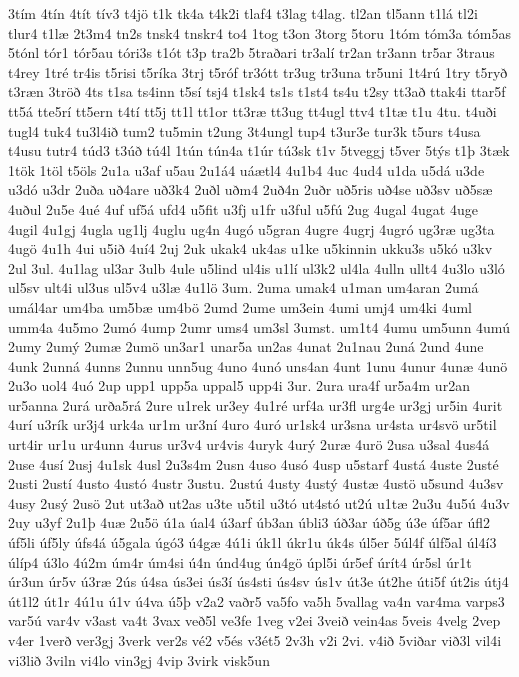 {3tím
4tín
4tít
tív3
t4jö
t1k
tk4a
t4k2i
tlaf4
t3lag
t4lag.
tl2an
tl5ann
t1lá
tl2i
tlur4
t1læ
2t3m4
tn2s
tnsk4
tnskr4
to4
1tog
t3on
3torg
5toru
1tóm
tóm3a
tóm5as
5tónl
tór1
tór5au
tóri3s
t1ót
t3p
tra2b
5traðari
tr3alí
tr2an
tr3ann
tr5ar
3traus
t4rey
1tré
tr4is
t5risi
t5ríka
3trj
t5róf
tr3ótt
tr3ug
tr3una
tr5uni
1t4rú
1try
t5ryð
t3ræn
3tröð
4ts
t1sa
ts4inn
t5sí
tsj4
t1sk4
ts1s
t1st4
ts4u
t2sy
tt3að
ttak4i
ttar5f
tt5á
tte5rí
tt5ern
t4tí
tt5j
tt1l
tt1or
tt3ræ
tt3ug
tt4ugl
ttv4
t1tæ
t1u
4tu.
t4uði
tugl4
tuk4
tu3l4ið
tum2
tu5min
t2ung
3t4ungl
tup4
t3ur3e
tur3k
t5urs
t4usa
t4usu
tutr4
túd3
t3úð
tú4l
1tún
tún4a
t1úr
tú3sk
t1v
5tveggj
t5ver
5týs
t1þ
3tæk
1tök
1töl
t5öls
2u1a
u3af
u5au
2u1á4
uáætl4
4u1b4
4uc
4ud4
u1da
u5dá
u3de
u3dó
u3dr
2uða
uð4are
uð3k4
2uðl
uðm4
2uð4n
2uðr
uð5ris
uð4se
uð3sv
uð5sæ
4uðul
2u5e
4ué
4uf
uf5á
ufd4
u5fit
u3fj
u1fr
u3ful
u5fú
2ug
4ugal
4ugat
4uge
4ugil
4u1gj
4ugla
ug1lj
4uglu
ug4n
4ugó
u5gran
4ugre
4ugrj
4ugró
ug3ræ
ug3ta
4ugö
4u1h
4ui
u5ið
4uí4
2uj
2uk
ukak4
uk4as
u1ke
u5kinnin
ukku3s
u5kó
u3kv
2ul
3ul.
4u1lag
ul3ar
3ulb
4ule
u5lind
ul4is
u1lí
ul3k2
ul4la
4ulln
ullt4
4u3lo
u3ló
ul5sv
ult4i
ul3us
ul5v4
u3læ
4u1lö
3um.
2uma
umak4
u1man
um4aran
2umá
umál4ar
um4ba
um5bæ
um4bö
2umd
2ume
um3ein
4umi
umj4
um4ki
4uml
umm4a
4u5mo
2umó
4ump
2umr
ums4
um3sl
3umst.
um1t4
4umu
um5unn
4umú
2umy
2umý
2umæ
2umö
un3ar1
unar5a
un2as
4unat
2u1nau
2uná
2und
4une
4unk
2unná
4unns
2unnu
unn5ug
4uno
4unó
uns4an
4unt
1unu
4unur
4unæ
4unö
2u3o
uol4
4uó
2up
upp1
upp5a
uppal5
upp4i
3ur.
2ura
ura4f
ur5a4m
ur2an
ur5anna
2urá
urða5rá
2ure
u1rek
ur3ey
4u1ré
urf4a
ur3fl
urg4e
ur3gj
ur5in
4urit
4urí
u3rík
ur3j4
urk4a
ur1m
ur3ní
4uro
4uró
ur1sk4
ur3sna
ur4sta
ur4svö
ur5til
urt4ir
ur1u
ur4unn
4urus
ur3v4
ur4vis
4uryk
4urý
2uræ
4urö
2usa
u3sal
4us4á
2use
4usí
2usj
4u1sk
4usl
2u3s4m
2usn
4uso
4usó
4usp
u5starf
4ustá
4uste
2usté
2usti
2ustí
4usto
4ustó
4ustr
3ustu.
2ustú
4usty
4ustý
4ustæ
4ustö
u5sund
4u3sv
4usy
2usý
2usö
2ut
ut3að
ut2as
u3te
u5til
u3tó
ut4stó
ut2ú
u1tæ
2u3u
4u5ú
4u3v
2uy
u3yf
2u1þ
4uæ
2u5ö
ú1a
úal4
ú3arf
úb3an
úbli3
úð3ar
úð5g
ú3e
úf5ar
úfl2
úf5li
úf5ly
úfs4á
ú5gala
úgó3
ú4gæ
4ú1i
úk1l
úkr1u
úk4s
úl5er
5úl4f
úlf5al
úl4í3
úlíp4
ú3lo
4ú2m
úm4r
úm4si
ú4n
únd4ug
ún4gö
úpl5i
úr5ef
úrít4
úr5sl
úr1t
úr3un
úr5v
ú3ræ
2ús
ú4sa
ús3ei
ús3í
ús4sti
ús4sv
ús1v
út3e
út2he
úti5f
út2is
útj4
út1l2
út1r
4ú1u
ú1v
ú4va
ú5þ
v2a2
vaðr5
va5fo
va5h
5vallag
va4n
var4ma
varps3
var5ú
var4v
v3ast
va4t
3vax
veð5l
ve3fe
1veg
v2ei
3veið
vein4as
5veis
4velg
2vep
v4er
1verð
ver3gj
3verk
ver2s
vé2
v5és
v3ét5
2v3h
v2i
2vi.
v4ið
5viðar
við3l
vil4i
vi3lið
3viln
vi4lo
vin3gj
4vip
3virk
visk5un
}
